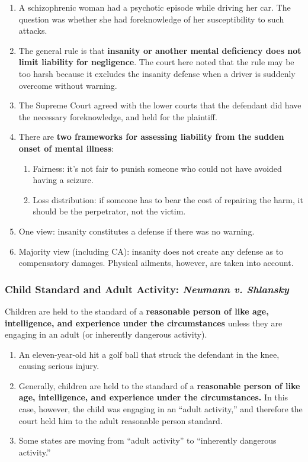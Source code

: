 \begin{enumerate}
    \item A schizophrenic woman had a psychotic episode while driving her car. 
    The question was whether she had foreknowledge of her susceptibility to 
    such attacks.
    \item The general rule is that \textbf{insanity or another mental deficiency does 
    not limit liability for negligence}. The court here noted that the rule may 
    be too harsh because it excludes the insanity defense when a driver is suddenly 
    overcome without warning.
    \item The Supreme Court agreed with the lower courts that the defendant 
    did have the necessary foreknowledge, and held for the plaintiff.
    \item There are \textbf{two frameworks for assessing liability from the sudden 
    onset of mental illness}:
    \begin{enumerate}
        \item Fairness: it's not fair to punish someone who could not have 
        avoided having a seizure.
        \item Loss distribution: if someone has to bear the cost of repairing 
        the harm, it should be the perpetrator, not the victim.
    \end{enumerate}
    \item One view: insanity constitutes a defense if there was no warning.
    \item Majority view (including CA): insanity does not create any defense 
    as to compensatory damages. Physical ailments, however, are taken into 
    account.
\end{enumerate}

\subsubsection{Child Standard and Adult Activity: \emph{Neumann v. Shlansky}}

Children are held to the standard of a \textbf{reasonable person of like age, 
intelligence, and experience under the circumstances} unless they are engaging 
in an adult (or inherently dangerous activity).

\begin{enumerate}
    \item An eleven-year-old hit a golf ball that struck the defendant in the 
    knee, causing serious injury.
    \item Generally, children are held to the standard of a \textbf{reasonable 
    person of like age, intelligence, and experience under the circumstances.} 
    In this case, however, the child was engaging in an ``adult activity,'' 
    and therefore the court held him to the adult reasonable person standard.
    \item Some states are moving from ``adult activity'' to ``inherently 
    dangerous activity.''
\end{enumerate}

